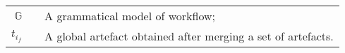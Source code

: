 \begin{center}
	\begin{tabular}[t]{rp{5mm}p{12cm}}
		$\mathbb{G}$ & &  A grammatical model of workflow; \\
		$t_{i_f}$ & & A global artefact obtained after merging a set of artefacts.
	\end{tabular}
\end{center}
